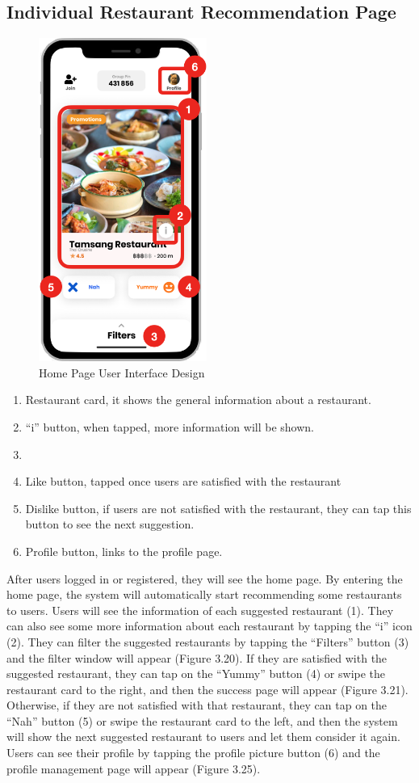 \documentclass[12pt,oneside,openright,a4paper]{cpe-english-project}
\begin{document}
\subsection{Individual Restaurant Recommendation Page}
\begin{figure}[!h]\centering
\includegraphics[height=300pt]{./images/3ui_HomePageUserInterfaceDesign.png}
\caption{Home Page User Interface Design}\label{fig:3ui_HomePageUserInterfaceDesign}
\end{figure}
\begin{enumerate}
\item Restaurant card, it shows the general information about a restaurant.
\item “i” button, when tapped, more information will be shown.
\item 
\item Like button, tapped once users are satisfied with the restaurant
\item Dislike button, if users are not satisfied with the restaurant, they can tap this button to see the next suggestion.
\item Profile button, links to the profile page.
\end{enumerate}
After users logged in or registered, they will see the home page. By entering the home page, the system will automatically start recommending some restaurants to users. Users will see the information of each suggested restaurant (1). They can also see some more information about each restaurant by tapping the “i” icon (2). They can filter the suggested restaurants by tapping the “Filters” button (3) and the filter window will appear (Figure 3.20). If they are satisfied with the suggested restaurant, they can tap on the “Yummy” button (4) or swipe the restaurant card to the right, and then the success page will appear (Figure 3.21). Otherwise, if they are not satisfied with that restaurant, they can tap on the “Nah” button (5) or swipe the restaurant card to the left, and then the system will show the next suggested restaurant to users and let them consider it again. Users can see their profile by tapping the profile picture button (6) and the profile management page will appear (Figure 3.25).
\end{document}
